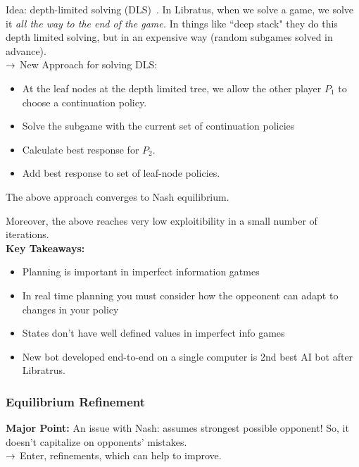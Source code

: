 Idea: depth-limited solving (DLS)~\cite{brown2018depth}. In Libratus, when we solve a game, we solve it {\it all the way to the end of the game.} In things like ``deep stack" they do this depth limited solving, but in an expensive way (random subgames solved in advance). \\

$\rightarrow$ New Approach for solving DLS:
\begin{itemize}
    \item At the leaf nodes at the depth limited tree, we allow the other player $P_1$ to choose a continuation policy.
    \item Solve the subgame with the current set of continuation policies
    \item Calculate best response for $P_2$.
    \item Add best response to set of leaf-node policies.
\end{itemize}

\begin{theorem}
The above approach converges to Nash equilibrium.
\end{theorem}

Moreover, the above reaches very low exploitibility in a small number of iterations. \\

{\bf Key Takeaways:}
\begin{itemize}
    \item Planning is important in imperfect information gatmes
    \item In real time planning you must consider how the oppeonent can adapt to changes in your policy
    \item States don't have well defined values in imperfect info games
    \item New bot developed end-to-end on a single computer is 2nd best AI bot after Libratrus.
\end{itemize}

\subsubsection{Equilibrium Refinement}

{\bf Major Point:} An issue with Nash: assumes strongest possible opponent! So, it doesn't capitalize on opponents' mistakes. \\

$\rightarrow$ Enter, refinements, which can help to improve. \\

